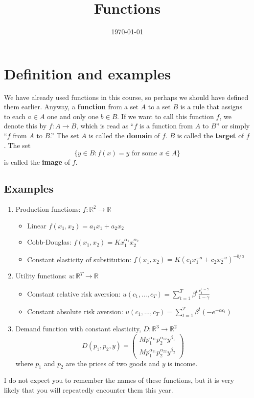\documentclass[12pt,reqno]{amsart}
\title{Functions}
\date{\today}
\theoremstyle{definition}
\def\R{\mathbb{R}}
\renewcommand{\to}{{\rightarrow}}
\begin{document}
\maketitle

\section{Definition and examples}

 We have already used functions in this course, so perhaps we should
have defined them earlier. Anyway, a \textbf{function} from a set $A$
to a set $B$ is a rule that assigns to each $a \in A$ one and only one
$b \in B$. If we want to call this function $f$, we denote this by
$f:A \to B$, which is read as ``$f$ is a function from $A$ to $B$'' or
simply ``$f$ from $A$ to $B$.'' The set $A$ is called the
\textbf{domain} of $f$. $B$ is called the \textbf{target} of $f$. The
set 
\[ \{y  \in B:  f(x) = y \text{ for some } x \in A \} \]
is called the \textbf{image} of $f$. 

\subsection{Examples}

\begin{enumerate}
\item Production functions: $f:\R^2 \to \R$ 
  \begin{itemize}
  \item Linear $ f(x_1,x_2) = a_1 x_1 + a_2 x_2 $
  \item Cobb-Douglas: $f(x_1,x_2) = K x_1^{\alpha_1} x_2^{\alpha_2}$
  \item Constant elasticity of substitution: $f(x_1,x_2) = K (c_1
    x_1^{-a} + c_2 x_2^{-a})^{-b/a}$
  \end{itemize}
\item Utility functions: $u: \R^T \to \R$
  \begin{itemize}
  \item Constant relative risk aversion: $u(c_1,...,c_T) =
    \sum_{t=1}^T \beta^t \frac{c_t^{1-\gamma}}{1-\gamma}$
  \item Constant absolute risk aversion: $u(c_1,...,c_T) =
    \sum_{t=1}^T \beta^t (-e^{-\alpha c_t})$
  \end{itemize}
\item Demand function with constant elasticity,  $D:\R^3 \to \R^2$
  \[ D(p_1,p_2,y) = \begin{pmatrix} M p_1^{\alpha_{11}}
    p_2^{\alpha_{12}} y^{\beta_1} \\
    M p_1^{\alpha_{21}} p_2^{\alpha_{22}} y^{\beta_2}
  \end{pmatrix}
  \]  
  where $p_1$ and $p_2$ are the prices of two goods and $y$ is income.
\end{enumerate}
I do not expect you to remember the names of these functions, but it
is very likely that you will repeatedly encounter them this year. 
\end{document}
